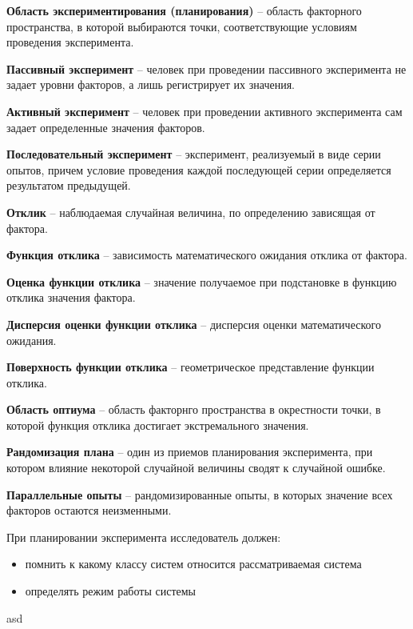 \textbf{Область экспериментирования (планирования)} -- область факторного пространства, в которой выбираются точки, соответствующие условиям проведения эксперимента.

\textbf{Пассивный эксперимент} -- человек при проведении пассивного эксперимента не задает уровни факторов, а лишь регистрирует их значения.

\textbf{Активный эксперимент} -- человек при проведении активного эксперимента сам задает определенные значения факторов.

\textbf{Последовательный эксперимент} -- эксперимент, реализуемый в виде серии опытов, причем условие проведения каждой последующей серии определяется результатом предыдущей.

\textbf{Отклик} -- наблюдаемая случайная величина, по определению зависящая от фактора.

\textbf{Функция отклика} -- зависимость математического ожидания отклика от фактора.

\textbf{Оценка функции отклика} -- значение получаемое при подстановке в функцию отклика значения фактора.

\textbf{Дисперсия оценки функции отклика} -- дисперсия оценки математического ожидания.

\textbf{Поверхность функции отклика} -- геометрическое представление функции отклика.

\textbf{Область оптиума} -- область факторнго пространства в окрестности точки, в которой функция отклика достигает экстремального значения.

\textbf{Рандомизация плана} -- один из приемов планирования эксперимента, при котором влияние некоторой случайной величины сводят к случайной ошибке.

\textbf{Параллельные опыты} -- рандомизированные опыты, в которых значение всех факторов остаются неизменными.

При планировании эксперимента исследователь должен:

\begin{itemize}
    \item помнить к какому классу систем относится рассматриваемая система
    \item определять режим работы системы
\end{itemize}

asd
